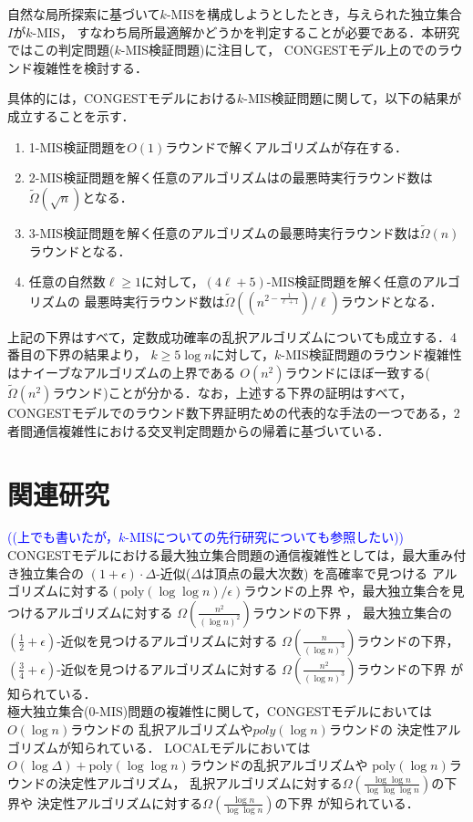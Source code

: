 \documentclass[12pt]{thesis}
\newcommand{\Izumi}[1]{\textcolor{blue}{(#1)}}
\newcommand{\CONGEST}{\textsf{CONGEST}}
\newcommand{\LOCAL}{\textsf{LOCAL}}
\theoremstyle{definition}
\begin{document}
自然な局所探索に基づいて$k$-MISを構成しようとしたとき，与えられた独立集合$I$が$k$-MIS，
すなわち局所最適解かどうかを判定することが必要である．本研究ではこの判定問題($k$-MIS検証問題)に注目して，
{\CONGEST}モデル上のでのラウンド複雑性を検討する．

具体的には，{\CONGEST}モデルにおける$k$-MIS検証問題に関して，以下の結果が成立することを示す．
\begin{enumerate}
\item 1-MIS検証問題を$O(1)$ラウンドで解くアルゴリズムが存在する．
\item 2-MIS検証問題を解く任意のアルゴリズムはの最悪時実行ラウンド数は$\tilde{\Omega} (\sqrt{n})$となる．
\item 3-MIS検証問題を解く任意のアルゴリズムの最悪時実行ラウンド数は$\tilde{\Omega}(n)$ラウンドとなる．
\item 任意の自然数$\ell \geq 1$に対して，$(4\ell + 5)$-MIS検証問題を解く任意のアルゴリズムの
最悪時実行ラウンド数は$\tilde{\Omega}\left((n^{2 - \frac{1}{\ell+1}})/\ell\right)$ラウンドとなる．
\end{enumerate}

上記の下界はすべて，定数成功確率の乱択アルゴリズムについても成立する．4番目の下界の結果より，
$k\geq 5\log n$に対して，$k$-MIS検証問題のラウンド複雑性はナイーブなアルゴリズムの上界である
$O(n^2)$ラウンドにほぼ一致する($\tilde{\Omega}(n^2)$ラウンド)ことが分かる．なお，上述する下界の証明はすべて，
{\CONGEST}モデルでのラウンド数下界証明ための代表的な手法の一つである，2者間通信複雑性における交叉判定問題からの帰着に基づいている．

\section{関連研究} 
\Izumi{(上でも書いたが，$k$-MISについての先行研究についても参照したい)}
{\CONGEST}モデルにおける最大独立集合問題の通信複雑性としては，最大重み付き独立集合の
$(1 + \epsilon) \cdot \Delta$-近似($\Delta$は頂点の最大次数) を高確率で見つける
アルゴリズムに対する$\left(\mathrm{poly}(\log \log n)/\epsilon \right)$ラウンドの上界
\cite{kawarabayashi2019improved} や，最大独立集合を見つけるアルゴリズムに対する
$\Omega \left(\frac{n^{2}}{(\log n)^{2}}\right)$ラウンドの下界 \cite{censor2017quadratic}，
最大独立集合の$(\frac{1}{2} + \epsilon)$-近似を見つけるアルゴリズムに対する
$\Omega \left(\frac{n}{(\log n)^{3}}\right)$ラウンドの下界，
$(\frac{3}{4} + \epsilon)$-近似を見つけるアルゴリズムに対する
$\Omega \left(\frac{n^{2}}{(\log n)^{3}}\right)$ラウンドの下界 \cite{efron2020beyond} が知られている．\\
極大独立集合(0-MIS)問題の複雑性に関して，{\CONGEST}モデルにおいては$O(\log n)$ラウンドの
乱択アルゴリズム\cite{luby1986simple}や$poly(\log n)$ラウンドの
決定性アルゴリズム\cite{rozhovn2020polylogarithmic}が知られている．
{\LOCAL}モデルにおいては$O(\log \Delta) + \mathrm{poly}(\log \log n)$ラウンドの乱択アルゴリズムや
$\mathrm{poly}(\log n)$ラウンドの決定性アルゴリズム\cite{rozhovn2020polylogarithmic}，
乱択アルゴリズムに対する$\Omega \left(\frac{\log \log n}{\log \log \log n} \right)$の下界や
決定性アルゴリズムに対する$\Omega \left(\frac{\log n}{\log \log n} \right)$の下界
\cite{balliu2019lower}が知られている．
\end{document}
